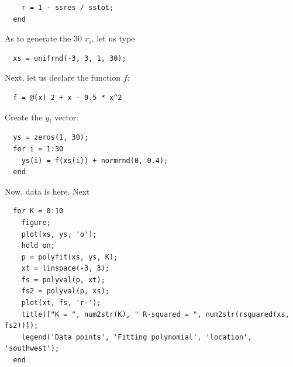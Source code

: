 \documentclass[10pt]{article}
\begin{document}
\begin{itemize}
\begin{verbatim}
    r = 1 - ssres / sstot;
  end
  \end{verbatim}
  As to generate the 30 $x_i$, let us type
  \begin{verbatim}
  xs = unifrnd(-3, 3, 1, 30);
  \end{verbatim}
  Next, let us declare the function $f$:
  \begin{verbatim}
  f = @(x) 2 + x - 0.5 * x^2
  \end{verbatim}
  Create the $y_i$ vector:
  \begin{verbatim}
  ys = zeros(1, 30);
  for i = 1:30
    ys(i) = f(xs(i)) + normrnd(0, 0.4);
  end
  \end{verbatim}
  Now, data is here. Next
  \begin{verbatim}
  for K = 0:10
    figure;
    plot(xs, ys, 'o');
    hold on;
    p = polyfit(xs, ys, K);
    xt = linspace(-3, 3);
    fs = polyval(p, xt);
    fs2 = polyval(p, xs);
    plot(xt, fs, 'r-');
    title(["K = ", num2str(K), " R-squared = ", num2str(rsquared(xs, fs2))]);
    legend('Data points', 'Fitting polynomial', 'location', 'southwest');
  end
  \end{verbatim}    
  

\end{itemize}
\end{document}
